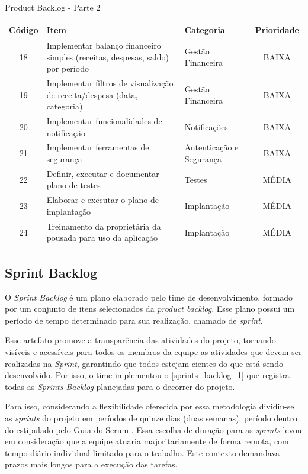 \documentclass[
	12pt,				%
	openany,			%
	oneside,			%
	a4paper,			%
	english,			%
	french,				%
	spanish,			%
	brazil				%
	]{abntex2}
\begin{document}
%
\begin{quadro}[H]
	\caption{Product Backlog - Parte 2}
	\label{product_backlog_2}
	\begin{tabular}{|c|p{6.5cm}|p{3.8cm}|c|}
		\hline
		\textbf{Código} & \textbf{Item} & \textbf{Categoria} & \textbf{Prioridade} \\	\hline	
		18 & Implementar balanço financeiro simples (receitas, despesas, saldo) por período & Gestão Financeira & BAIXA \\ \hline
		19 & Implementar filtros de visualização de receita/despesa (data, categoria) &	Gestão Financeira & BAIXA \\ \hline
		20 & Implementar  funcionalidades de notificação & Notificações &
		BAIXA \\ \hline
		21 & Implementar ferramentas de segurança &	Autenticação e Segurança &
		BAIXA \\ \hline
		22 & Definir, executar e documentar plano de testes & Testes & MÉDIA \\ \hline
		23 & Elaborar e executar o plano de implantação & Implantação & 
		MÉDIA \\ \hline
		24 & Treinamento da proprietária da pousada para uso da aplicação &	Implantação & MÉDIA \\ \hline
	\end{tabular}
\end{quadro}
% 
\subsection{Sprint Backlog}
O \textit{Sprint Backlog} é um plano elaborado pelo time de desenvolvimento, formado por um conjunto de itens selecionados da \textit {product backlog}. Esse plano possui um período de tempo determinado para sua realização, chamado de \textit {sprint}. 

Esse artefato promove a transparência das atividades do projeto, tornando visíveis e acessíveis para todos os membros da equipe as atividades que devem ser realizadas na \textit {Sprint}, garantindo que todos estejam cientes do que está sendo desenvolvido. Por isso, o time implementou o \autoref{sprints_backlog_1} que registra todas as \textit {Sprints Backlog} planejadas para o decorrer do projeto.

Para isso, considerando a flexibilidade oferecida por essa metodologia dividiu-se as \textit {sprints} do projeto em períodos de quinze dias (duas semanas), período dentro do estipulado pelo Guia do Scrum \cite{scrumguide}. Essa escolha de duração para as \textit {sprints} levou em consideração que a equipe atuaria majoritariamente de forma remota, com tempo diário individual limitado para o trabalho. Este contexto demandava prazos mais longos para a execução das tarefas.
\end{document}
